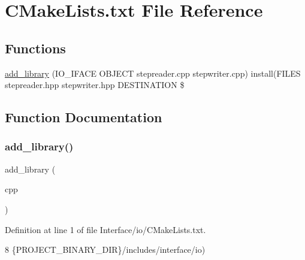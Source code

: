 \hypertarget{Interface_2io_2CMakeLists_8txt}{}\section{C\+Make\+Lists.\+txt File Reference}
\label{Interface_2io_2CMakeLists_8txt}
\subsection*{Functions}
\begin{DoxyCompactItemize}
\item 
\hyperlink{Interface_2io_2CMakeLists_8txt_a9e5db41820b3c3deca2b4fedab6d00ae}{add\+\_\+library} (I\+O\+\_\+\+I\+F\+A\+CE O\+B\+J\+E\+CT stepreader.\+cpp stepwriter.\+cpp) install(F\+I\+L\+ES stepreader.\+hpp stepwriter.\+hpp D\+E\+S\+T\+I\+N\+A\+T\+I\+ON \$
\end{DoxyCompactItemize}


\subsection{Function Documentation}
\mbox{\label{Interface_2io_2CMakeLists_8txt_a9e5db41820b3c3deca2b4fedab6d00ae}} 
\subsubsection{\texorpdfstring{add\+\_\+library()}{add\_library()}}
{\footnotesize\ttfamily add\+\_\+library (\begin{DoxyParamCaption}\item[{I\+O\+\_\+\+I\+F\+A\+CE O\+B\+J\+E\+CT stepreader.\+cpp stepwriter.}]{cpp }\end{DoxyParamCaption})}



Definition at line 1 of file Interface/io/\+C\+Make\+Lists.\+txt.


\begin{DoxyCode}
8                \{PROJECT\_BINARY\_DIR\}/includes/interface/io)
\end{DoxyCode}
